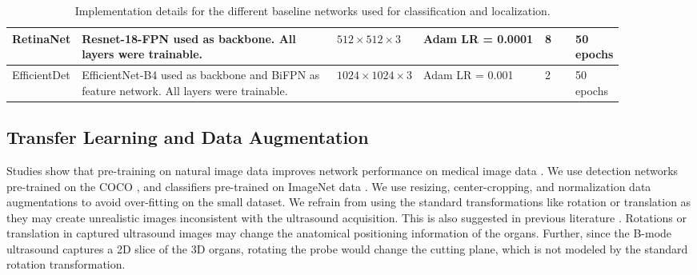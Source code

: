 \begin{table}[t]
{\begin{tabular}{p{0.1\linewidth}p{0.42\linewidth}p{0.06\linewidth}p{0.2\linewidth}p{0.05\linewidth}p{0.06\linewidth}}
        RetinaNet \cite{retinanet} & Resnet-18-FPN used as backbone. All layers were trainable. & $512\times512\times3$ & Adam LR = 0.0001 & 8 & 50 epochs \\ \hline
        EfficientDet \cite{efficientdet} & EfficientNet-B4 used as backbone and BiFPN as feature network. All layers were trainable. & $1024\times1024\times3$ & Adam LR = 0.001 & 2 & 50 epochs \\ 
        \bottomrule
    \end{tabular}
    }
    \caption[Implementation details for the different baseline networks]{Implementation details for the different baseline networks used for classification and \gb localization.}
    \label{tbl:configs}
\end{table}

\subsection{Transfer Learning and Data Augmentation}
%
Studies show that pre-training on natural image data improves network performance on medical image data \cite{alzubaidi2020transferlearning, cheng2017transfer}. We use \roi detection networks pre-trained on the COCO \cite{coco}, and classifiers pre-trained on ImageNet data \cite{imagenet}. We use resizing, center-cropping, and normalization data augmentations to avoid over-fitting on the small \usg dataset. We refrain from using the standard transformations like rotation or translation as they may create unrealistic images inconsistent with the ultrasound acquisition. This is also suggested in previous literature \cite{tirindelli2021rethinking}. Rotations or translation in captured ultrasound images may change the anatomical positioning information of the organs. Further, since the B-mode ultrasound captures a 2D slice of the 3D organs, rotating the probe would change the cutting plane, which is not modeled by the standard rotation transformation. 

